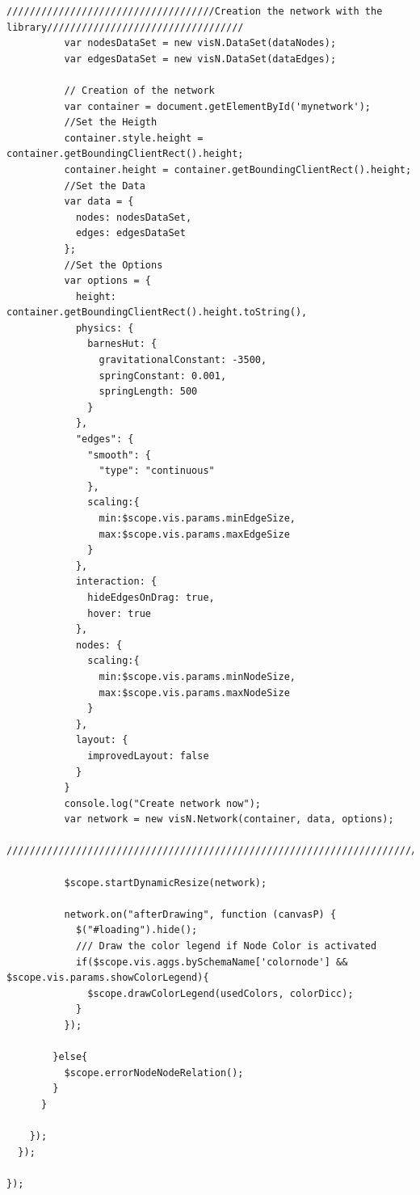 \documentclass[a4paper, 12pt]{book}
\begin{document}
\begin{lstlisting}[frame=single]
          ////////////////////////////////////Creation the network with the library//////////////////////////////////
          var nodesDataSet = new visN.DataSet(dataNodes);
          var edgesDataSet = new visN.DataSet(dataEdges);

          // Creation of the network
          var container = document.getElementById('mynetwork');
          //Set the Heigth
          container.style.height = container.getBoundingClientRect().height;
          container.height = container.getBoundingClientRect().height;
          //Set the Data
          var data = {
            nodes: nodesDataSet,
            edges: edgesDataSet
          };
          //Set the Options
          var options = {
            height: container.getBoundingClientRect().height.toString(),
            physics: {
              barnesHut: {
                gravitationalConstant: -3500,
                springConstant: 0.001,
                springLength: 500
              }
            },
            "edges": {
              "smooth": {
                "type": "continuous"
              },
              scaling:{
                min:$scope.vis.params.minEdgeSize,
                max:$scope.vis.params.maxEdgeSize
              }
            },
            interaction: {
              hideEdgesOnDrag: true,
              hover: true
            },
            nodes: {
              scaling:{
                min:$scope.vis.params.minNodeSize,
                max:$scope.vis.params.maxNodeSize
              }
            },
            layout: {
              improvedLayout: false
            }
          }
          console.log("Create network now");
          var network = new visN.Network(container, data, options);
          //////////////////////////////////////////////////////////////////////////////////////////////////////////////

          $scope.startDynamicResize(network);

          network.on("afterDrawing", function (canvasP) {
            $("#loading").hide();
            /// Draw the color legend if Node Color is activated
            if($scope.vis.aggs.bySchemaName['colornode'] && $scope.vis.params.showColorLegend){
              $scope.drawColorLegend(usedColors, colorDicc);
            }
          });

        }else{
          $scope.errorNodeNodeRelation();
        }
      }

    });
  });

});
\end{lstlisting}
\end{document}
